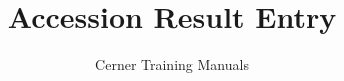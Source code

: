 

\renewcommand{\maketitlepage}[0]{%
  \cleardoublepage%
  {%
    \pagestyle{plain}%
    \sffamily%
    \begin{fullwidth}%
      \fontsize{18}{20}\selectfont\par\noindent\textcolor{darkgray}{\allcaps{\thanklessauthor}}%
      \vspace{11.5pc}%
      \fontsize{28}{29}\selectfont\par\noindent\textcolor{darkgray}{\allcaps{\thanklesstitle}}%
      \vfill%
      \fontsize{14}{16}\selectfont\par\noindent\allcaps{\thanklesspublisher}%
    \end{fullwidth}%
  }
}

\title{Accession Result Entry} %
\author{Cerner Training Manuals}



    \frontmatter
        \maketitle %
        \begin{fullwidth}
          \tableofcontents
          \listoftables
        \end{fullwidth}
        \cleardoublepage

    \mainmatter
        

    \backmatter


